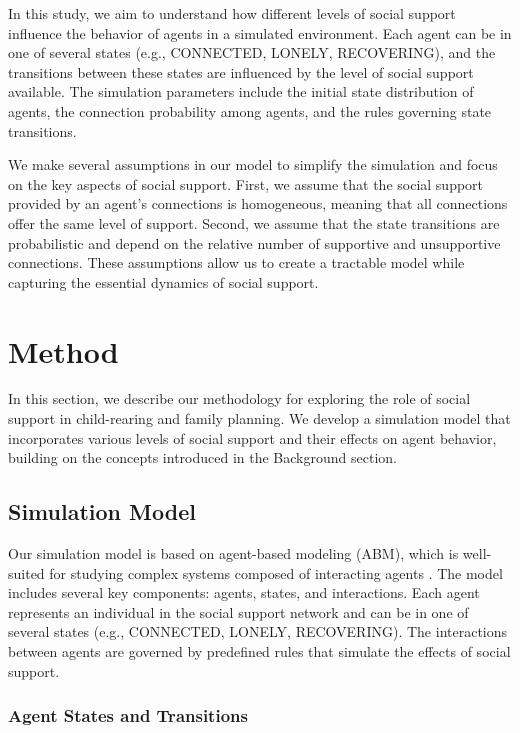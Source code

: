 \documentclass{article} %
\begin{document}
In this study, we aim to understand how different levels of social support influence the behavior of agents in a simulated environment. Each agent can be in one of several states (e.g., CONNECTED, LONELY, RECOVERING), and the transitions between these states are influenced by the level of social support available. The simulation parameters include the initial state distribution of agents, the connection probability among agents, and the rules governing state transitions.

We make several assumptions in our model to simplify the simulation and focus on the key aspects of social support. First, we assume that the social support provided by an agent's connections is homogeneous, meaning that all connections offer the same level of support. Second, we assume that the state transitions are probabilistic and depend on the relative number of supportive and unsupportive connections. These assumptions allow us to create a tractable model while capturing the essential dynamics of social support.

\section{Method}
\label{sec:method}

In this section, we describe our methodology for exploring the role of social support in child-rearing and family planning. We develop a simulation model that incorporates various levels of social support and their effects on agent behavior, building on the concepts introduced in the Background section.

\subsection{Simulation Model}
\label{sec:simulation_model}

Our simulation model is based on agent-based modeling (ABM), which is well-suited for studying complex systems composed of interacting agents \citep{liu2023agentbench}. The model includes several key components: agents, states, and interactions. Each agent represents an individual in the social support network and can be in one of several states (e.g., CONNECTED, LONELY, RECOVERING). The interactions between agents are governed by predefined rules that simulate the effects of social support.

\subsubsection{Agent States and Transitions}
\label{sec:agent_states}
\end{document}
